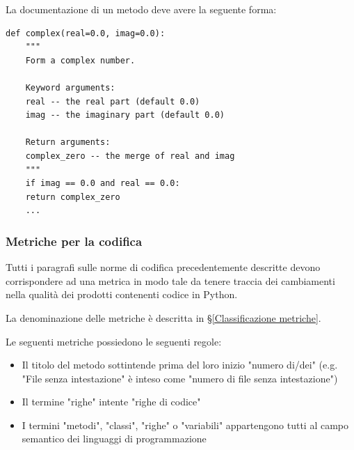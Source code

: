         La documentazione di un metodo deve avere la seguente forma:
\begin{verbatim}
def complex(real=0.0, imag=0.0):
    """
    Form a complex number.
    
    Keyword arguments:
    real -- the real part (default 0.0)
    imag -- the imaginary part (default 0.0)
    
    Return arguments:
    complex_zero -- the merge of real and imag
    """
    if imag == 0.0 and real == 0.0:
    return complex_zero
    ...
\end{verbatim}



        \subsubsection{Metriche per la codifica}\label{PP:Sviluppo:MetricheCodifica}
        Tutti i paragrafi sulle norme di codifica precedentemente descritte devono corrispondere ad una metrica in modo tale da tenere traccia dei cambiamenti nella qualità dei prodotti contenenti codice in Python.
        
        La denominazione delle metriche è descritta in \S\ref{Classificazione metriche}.
        
        Le seguenti metriche possiedono le seguenti regole:
        \begin{itemize}
            \item Il titolo del metodo sottintende prima del loro inizio "numero di/dei" (e.g. "File senza intestazione" è inteso come "numero di file senza intestazione")
            \item Il termine "righe" intente "righe di codice"
            \item I termini "metodi", "classi", "righe" o "variabili" appartengono tutti al campo semantico dei linguaggi di programmazione
        \end{itemize}
    
